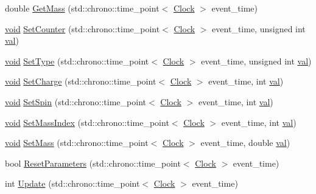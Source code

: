 \begin{DoxyCompactItemize}
double \mbox{\hyperlink{class_elementary_particle_a85400dc97f66c1ce23d9d961ddb6b8f3}{Get\+Mass}} (std\+::chrono\+::time\+\_\+point$<$ \mbox{\hyperlink{universe_8h_a0ef8d951d1ca5ab3cfaf7ab4c7a6fd80}{Clock}} $>$ event\+\_\+time)
\item 
\mbox{\hyperlink{glad_8h_a950fc91edb4504f62f1c577bf4727c29}{void}} \mbox{\hyperlink{class_elementary_particle_a141316fd968cce8ecc5aa11ce0757d63}{Set\+Counter}} (std\+::chrono\+::time\+\_\+point$<$ \mbox{\hyperlink{universe_8h_a0ef8d951d1ca5ab3cfaf7ab4c7a6fd80}{Clock}} $>$ event\+\_\+time, unsigned int \mbox{\hyperlink{glad_8h_a26942fd2ed566ef553eae82d2c109c8f}{val}})
\item 
\mbox{\hyperlink{glad_8h_a950fc91edb4504f62f1c577bf4727c29}{void}} \mbox{\hyperlink{class_elementary_particle_a37d7718faf6be68d4374bcc56816f30a}{Set\+Type}} (std\+::chrono\+::time\+\_\+point$<$ \mbox{\hyperlink{universe_8h_a0ef8d951d1ca5ab3cfaf7ab4c7a6fd80}{Clock}} $>$ event\+\_\+time, unsigned int \mbox{\hyperlink{glad_8h_a26942fd2ed566ef553eae82d2c109c8f}{val}})
\item 
\mbox{\hyperlink{glad_8h_a950fc91edb4504f62f1c577bf4727c29}{void}} \mbox{\hyperlink{class_elementary_particle_abbc6d3c58509c4121df55bfef716d2f1}{Set\+Charge}} (std\+::chrono\+::time\+\_\+point$<$ \mbox{\hyperlink{universe_8h_a0ef8d951d1ca5ab3cfaf7ab4c7a6fd80}{Clock}} $>$ event\+\_\+time, int \mbox{\hyperlink{glad_8h_a26942fd2ed566ef553eae82d2c109c8f}{val}})
\item 
\mbox{\hyperlink{glad_8h_a950fc91edb4504f62f1c577bf4727c29}{void}} \mbox{\hyperlink{class_elementary_particle_a437fa86d88157314b84662b158d52353}{Set\+Spin}} (std\+::chrono\+::time\+\_\+point$<$ \mbox{\hyperlink{universe_8h_a0ef8d951d1ca5ab3cfaf7ab4c7a6fd80}{Clock}} $>$ event\+\_\+time, int \mbox{\hyperlink{glad_8h_a26942fd2ed566ef553eae82d2c109c8f}{val}})
\item 
\mbox{\hyperlink{glad_8h_a950fc91edb4504f62f1c577bf4727c29}{void}} \mbox{\hyperlink{class_elementary_particle_a8a3b91409772f4091a782624a34024e7}{Set\+Mass\+Index}} (std\+::chrono\+::time\+\_\+point$<$ \mbox{\hyperlink{universe_8h_a0ef8d951d1ca5ab3cfaf7ab4c7a6fd80}{Clock}} $>$ event\+\_\+time, int \mbox{\hyperlink{glad_8h_a26942fd2ed566ef553eae82d2c109c8f}{val}})
\item 
\mbox{\hyperlink{glad_8h_a950fc91edb4504f62f1c577bf4727c29}{void}} \mbox{\hyperlink{class_elementary_particle_a778ff8188ecb369e533521ed4f94b034}{Set\+Mass}} (std\+::chrono\+::time\+\_\+point$<$ \mbox{\hyperlink{universe_8h_a0ef8d951d1ca5ab3cfaf7ab4c7a6fd80}{Clock}} $>$ event\+\_\+time, double \mbox{\hyperlink{glad_8h_a26942fd2ed566ef553eae82d2c109c8f}{val}})
\item 
bool \mbox{\hyperlink{class_elementary_particle_ac0f85f34bdfc1d42324201eb7c38e85e}{Reset\+Parameters}} (std\+::chrono\+::time\+\_\+point$<$ \mbox{\hyperlink{universe_8h_a0ef8d951d1ca5ab3cfaf7ab4c7a6fd80}{Clock}} $>$ event\+\_\+time)
\item 
int \mbox{\hyperlink{class_elementary_particle_abf5114c3d032bc9511a14aa7368ec450}{Update}} (std\+::chrono\+::time\+\_\+point$<$ \mbox{\hyperlink{universe_8h_a0ef8d951d1ca5ab3cfaf7ab4c7a6fd80}{Clock}} $>$ event\+\_\+time)
\end{DoxyCompactItemize}
